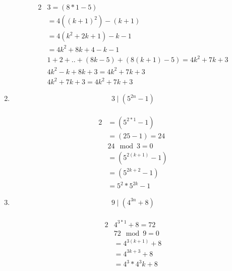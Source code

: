 \documentclass{article}
\begin{document}
\begin{enumerate}
\begin{alignat*}{2}
 & 3=(8*1-5) \\
 &=4((k+1)^2)-(k+1)\\
 &= 4(k^2+2k+1)-k-1 \\
 &= 4k^2+8k+4-k-1 \\
 &1+2+..+(8k-5)+(8(k+1)-5)= 4k^2+7k+3 \\
 &4k^2-k+8k+3=4k^2+7k+3 \\
 &4k^2+7k+3=4k^2+7k+3
 \end{alignat*}
\item
  \[
  3\mid (5^{2n} -1)
  \] \\
  \begin{alignat*}{2}
  &= (5^{2*1}-1) \\
  &= (25-1)=24 \\
  & 24\mod 3=0\\
  &=(5^{2(k+1)}-1) \\
  &=(5^{2k+2}-1) \\
  &=5^2*5^{2k}-1
  \end{alignat*}
\item
  \[
  9\mid (4^{3n} + 8)
  \]\\
  \begin{alignat*}{2}
  &4^{3*1}+8=72\\
  &72\mod9=0\\
  &=4^{3(k+1)}+8\\
  &=4^{3k+3}+8\\
  &=4^3*4^3k+8
  \end{alignat*}
\end{enumerate}
\end{document}
